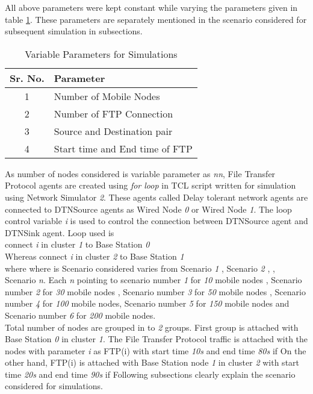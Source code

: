 \documentclass[3p,times]{elsarticle}
\begin{document}
All above parameters were kept constant while varying the parameters given in table \ref {t2}. These parameters are separately mentioned in the scenario considered for subsequent simulation in subsections.
\begin{table}[b]
\centering
\caption{Variable Parameters for Simulations}
\begin{tabular}{|c|l|}
\hline
Sr. No. & Parameter \\
\hline
1 & Number of Mobile Nodes \\
2 & Number of FTP Connection \\
3 & Source and Destination pair \\
4 & Start time and End time of FTP \\
\hline
\end{tabular}
\label{t2}
\end{table}
As number of nodes considered is variable parameter as \emph{nn}, File Transfer Protocol agents are created using \emph{for loop} in TCL script written for simulation using Network Simulator \emph{2}. These agents called Delay tolerant network agents are connected to DTNSource agents as Wired Node \emph{0} or Wired Node \emph{1}. The loop control variable \emph{i} is used to control the connection between DTNSource agent and DTNSink agent. Loop used is \\
 connect \emph{i} in  cluster \emph{1} to Base Station \emph{0} \\
Whereas
 connect \emph{i} in  cluster \emph{2} to Base Station \emph{1} \\
where   where  is Scenario considered varies from  Scenario \emph{1} , Scenario  \emph{2} ,   , Scenario  \emph{n}. Each \emph{n} pointing to scenario number 
\emph{1} for  \emph{10} mobile nodes , Scenario number  \emph{2} for \emph{30} mobile nodes , Scenario number \emph{3} for \emph{50} mobile nodes , Scenario number \emph{4} for \emph{100} mobile nodes, Scenario number \emph{5} for \emph{150} mobile nodes and Scenario number \emph{6} for \emph{200} mobile nodes. \\
Total number of nodes are grouped in to \emph{2} groups. First group is attached with Base Station \emph{0} in cluster \emph{1}. The File Transfer Protocol traffic is attached with the nodes with parameter \emph{i} as FTP(i) with start time \emph{10s} and end time \emph{80s} if  On the other hand, FTP(i) is attached with Base Station node \emph{1} in cluster \emph{2} with start time \emph{20s} and end time \emph{90s} if  Following subsections clearly explain the scenario considered for simulations.
\end{document}
